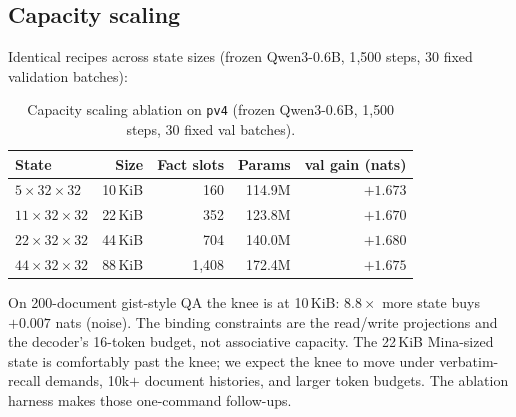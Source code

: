 \documentclass[11pt]{article}
\begin{document}
\subsection{Capacity scaling}
\label{sec:capacity}
Identical recipes across state sizes (frozen Qwen3-0.6B, 1{,}500
steps, 30 fixed validation batches):
\begin{table}[ht]
\centering
\caption{Capacity scaling ablation on \texttt{pv4} (frozen Qwen3-0.6B, 1{,}500 steps, 30 fixed val batches).}
\label{tab:capacity}
\begin{tabular}{lrrrr}
\toprule
State & Size & Fact slots & Params & val gain (nats)\\
\midrule
$5\times32\times32$ & 10\,KiB & 160 & 114.9M & $+1.673$\\
$11\times32\times32$ & 22\,KiB & 352 & 123.8M & $+1.670$\\
$22\times32\times32$ & 44\,KiB & 704 & 140.0M & $+1.680$\\
$44\times32\times32$ & 88\,KiB & 1{,}408 & 172.4M & $+1.675$\\
\bottomrule
\end{tabular}
\end{table}
On 200-document gist-style QA the knee is at 10\,KiB: $8.8\times$
more state buys $+0.007$ nats (noise). The binding constraints are the
read/write projections and the decoder's 16-token budget, not
associative capacity. The 22\,KiB Mina-sized state is comfortably past
the knee; we expect the knee to move under verbatim-recall demands,
10k$+$ document histories, and larger token budgets. The ablation
harness makes those one-command follow-ups.
\end{document}
